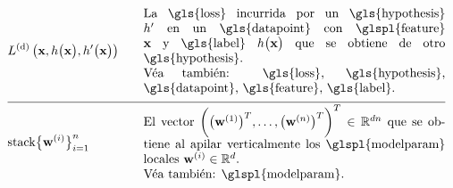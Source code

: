 \begin{align} 
   &\gtvloss{\featurevec}{\hypothesis\big(\featurevec\big)}{\hypothesis'\big(\featurevec\big)}& \quad & \parbox{.70\textwidth}{La \gls{loss} 
	   incurrida por un \gls{hypothesis} $\hypothesis'$ en un \gls{datapoint} con \glspl{feature} $\featurevec$ y \gls{label} 
	   $\hypothesis\big( \featurevec\big)$ que se obtiene de otro \gls{hypothesis}.
	   \\ Véa también: \gls{loss}, \gls{hypothesis}, \gls{datapoint}, \gls{feature}, \gls{label}.} \nonumber \\[2mm] \hline \nonumber\\[-5mm]
   &{\rm stack} \big\{ \weights^{(\nodeidx)} \big\}_{\nodeidx=1}^{\nrnodes} & \quad & \parbox{.70\textwidth}{El vector 
	   $\bigg( \big(\weights^{(1)}  \big)^{T}, \ldots, \big(\weights^{(\nrnodes)}  \big)^{T} \bigg)^{T} \in \mathbb{R}^{\dimlocalmodel\nrnodes}$ que 
	   se obtiene al apilar verticalmente los \glspl{modelparam} locales $\weights^{(\nodeidx)} \in \mathbb{R}^{\dimlocalmodel}$.
	   \\ Véa también: \glspl{modelparam}.} \nonumber 
\end{align}
